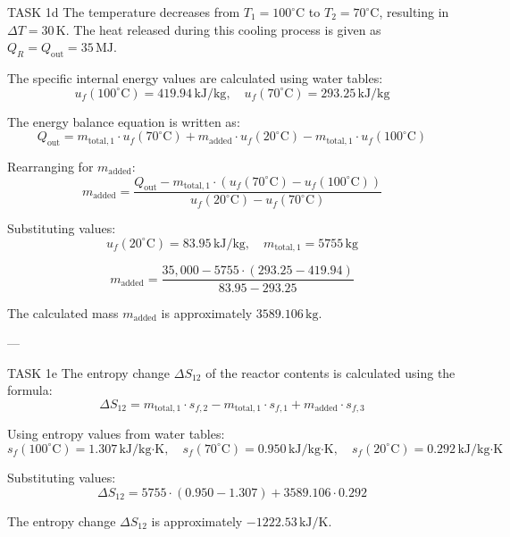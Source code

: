 TASK 1d  
The temperature decreases from \( T_1 = 100^\circ\text{C} \) to \( T_2 = 70^\circ\text{C} \), resulting in \( \Delta T = 30 \, \text{K} \). The heat released during this cooling process is given as \( Q_R = Q_{\text{out}} = 35 \, \text{MJ} \).  

The specific internal energy values are calculated using water tables:  
\[
u_f(100^\circ\text{C}) = 419.94 \, \text{kJ/kg}, \quad u_f(70^\circ\text{C}) = 293.25 \, \text{kJ/kg}
\]  

The energy balance equation is written as:  
\[
Q_{\text{out}} = m_{\text{total},1} \cdot u_f(70^\circ\text{C}) + m_{\text{added}} \cdot u_f(20^\circ\text{C}) - m_{\text{total},1} \cdot u_f(100^\circ\text{C})
\]  

Rearranging for \( m_{\text{added}} \):  
\[
m_{\text{added}} = \frac{Q_{\text{out}} - m_{\text{total},1} \cdot (u_f(70^\circ\text{C}) - u_f(100^\circ\text{C}))}{u_f(20^\circ\text{C}) - u_f(70^\circ\text{C})}
\]  

Substituting values:  
\[
u_f(20^\circ\text{C}) = 83.95 \, \text{kJ/kg}, \quad m_{\text{total},1} = 5755 \, \text{kg}
\]  

\[
m_{\text{added}} = \frac{35,000 - 5755 \cdot (293.25 - 419.94)}{83.95 - 293.25}
\]  

The calculated mass \( m_{\text{added}} \) is approximately \( 3589.106 \, \text{kg} \).  

---

TASK 1e  
The entropy change \( \Delta S_{12} \) of the reactor contents is calculated using the formula:  
\[
\Delta S_{12} = m_{\text{total},1} \cdot s_{f,2} - m_{\text{total},1} \cdot s_{f,1} + m_{\text{added}} \cdot s_{f,3}
\]  

Using entropy values from water tables:  
\[
s_f(100^\circ\text{C}) = 1.307 \, \text{kJ/kg·K}, \quad s_f(70^\circ\text{C}) = 0.950 \, \text{kJ/kg·K}, \quad s_f(20^\circ\text{C}) = 0.292 \, \text{kJ/kg·K}
\]  

Substituting values:  
\[
\Delta S_{12} = 5755 \cdot (0.950 - 1.307) + 3589.106 \cdot 0.292
\]  

The entropy change \( \Delta S_{12} \) is approximately \( -1222.53 \, \text{kJ/K} \).  

